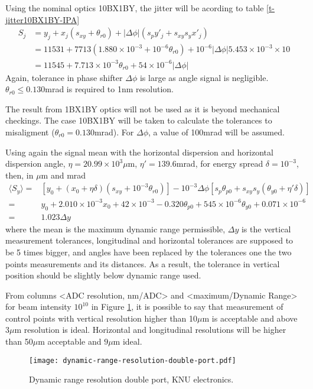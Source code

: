 Using the nominal optics 10BX1BY, the jitter will be acording to table \ref{t-jitter10BX1BY-IPA}
\begin{align*}
S_j&=y_j+x_j(s_{xy}+\theta_{r0})+|\Delta\phi|(s_py'_j+s_{xy}s_yx'_j)\\
 &=11531+7713(1.880\times10^{-3}+10^{-6}\theta_{r0})+10^{-6}|\Delta\phi|5.453\times10^{-3}\times10\\
 &=11545+7.713\times10^{-3}\theta_{r0}+54\times10^{-6}|\Delta\phi|
\end{align*}
Again, tolerance in phase shifter $\Delta\phi$ is large as angle signal is negligible. $\theta_{r0}\leq 0.130$mrad is required to 1nm resolution.\par
The result from 1BX1BY optics will not be used as it is beyond mechanical checkings. The case 10BX1BY will be taken to calculate the tolerances to misaligment ($\theta_{r0}= 0.130$mrad). For $\Delta\phi$, a value of 100mrad will be assumed.\par
Using again the signal mean with the horizontal dispersion and horizontal dispersion angle,  $\eta=20.99\times10^{3}\mu$m, $\eta'=139.6$mrad, for energy spread $\delta=10^{-3}$, then, in $\mu$m and mrad
\begin{align*}
  \langle S_y\rangle =& [y_0+(x_0+\eta\delta)(s_{xy}+10^{-3}\theta_{r0})]-10^{-3}\Delta\phi[s_p\theta_{p0}+s_{xy}s_y(\theta_{y0}+\eta'\delta)]\\
 =& y_0+2.010\times10^{-3}x_0+42\times10^{-3}-0.320\theta_{p0}+545\times10^{-6}\theta_{y0}+0.071\times10^{-6}\\
 =&1.023\Delta y
\end{align*}
where the mean is the maximum dynamic range permissible, $\Delta y$ is the vertical measurement tolerances, longitudinal and horizontal tolerances are supposed to be 5 times bigger, and angles have been replaced by the tolerances one the two points measurements and its distances. As a result, the tolerance in vertical position should be slightly below dynamic range used.\par
From columns <ADC resolution, nm/ADC> and <maximum/Dynamic Range> for beam intensity $10^{10}$ in Figure \ref{f-dynrange-KNU}, it is possible to say that measurement of control points with vertical resolution higher than 10$\mu$m is acceptable and above $3\mu$m resolution is ideal. Horizontal and longitudinal resolutions will be higher than 50$\mu$m acceptable and $9\mu$m ideal.
\begin{figure}[htb]
 \begin{center}
  \texttt{[image: dynamic-range-resolution-double-port.pdf]}\caption{Dynamic range resolution double port, KNU electronics.}\label{f-dynrange-KNU}
 \end{center}
\end{figure}